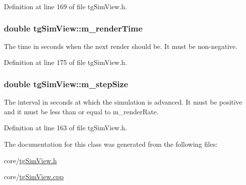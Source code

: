 Definition at line 169 of file tg\-Sim\-View.\-h.

\hypertarget{classtg_sim_view_af9665b86a366fc966bedf3f11fc1917d}{
\subsubsection[{m\-\_\-render\-Time}]{\setlength{\rightskip}{0pt plus 5cm}double tg\-Sim\-View\-::m\-\_\-render\-Time\hspace{0.3cm}{\ttfamily [protected]}}}\label{classtg_sim_view_af9665b86a366fc966bedf3f11fc1917d}
The time in seconds when the next render should be. It must be non-\/negative. 

Definition at line 175 of file tg\-Sim\-View.\-h.

\hypertarget{classtg_sim_view_a150d4c27a7a07d538aa405407e6ec239}{
\subsubsection[{m\-\_\-step\-Size}]{\setlength{\rightskip}{0pt plus 5cm}double tg\-Sim\-View\-::m\-\_\-step\-Size\hspace{0.3cm}{\ttfamily [protected]}}}\label{classtg_sim_view_a150d4c27a7a07d538aa405407e6ec239}
The interval in seconds at which the simulation is advanced. It must be positive and it must be less than or equal to m\-\_\-render\-Rate. 

Definition at line 163 of file tg\-Sim\-View.\-h.



The documentation for this class was generated from the following files\-:\begin{DoxyCompactItemize}
\item 
core/\hyperlink{tg_sim_view_8h}{tg\-Sim\-View.\-h}\item 
core/\hyperlink{tg_sim_view_8cpp}{tg\-Sim\-View.\-cpp}\end{DoxyCompactItemize}
